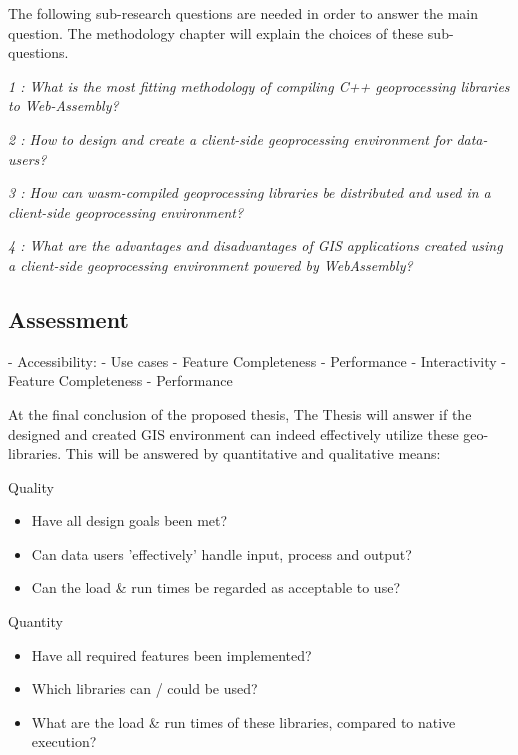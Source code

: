 The following sub-research questions are needed in order to answer the main question. The methodology chapter will explain the choices of these sub-questions. 


\textit{1 : What is the most fitting methodology of compiling C++ geoprocessing   libraries to Web-Assembly?}

\textit{2 : How to design and create a client-side geoprocessing environment for data-users?}

\textit{3 : How can wasm-compiled geoprocessing libraries be distributed and used in a client-side geoprocessing environment?}

\textit{4 : What are the advantages and disadvantages of GIS applications created using a client-side geoprocessing environment powered by WebAssembly?}

\newpage
\subsection*{Assessment}

- Accessibility: 
  - Use cases
    - Feature Completeness 
    - Performance
- Interactivity 
  - Feature Completeness 
  - Performance


At the final conclusion of the proposed thesis, The Thesis will answer if the designed and created GIS environment can indeed effectively utilize these geo-libraries.
This will be answered by quantitative and qualitative means:

Quality
\begin{itemize}
    \item Have all design goals been met?
    \item Can data users 'effectively' handle input, process and output?
    \item Can the load \& run times be regarded as acceptable to use? 
\end{itemize} 

Quantity
\begin{itemize}
    \item Have all required features been implemented?
    \item Which libraries can / could be used?
    \item What are the load \& run times of these libraries, compared to native execution?
\end{itemize} 

\newpage
